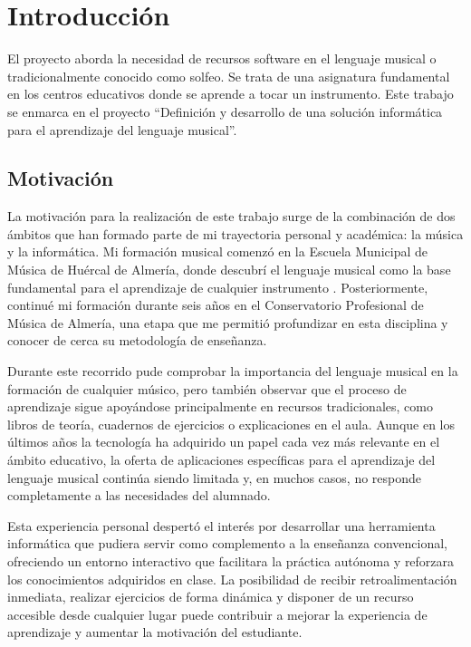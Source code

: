 \chapter {Introducción}
\label{sec:intro}
\rmfamily
El proyecto aborda la necesidad de recursos software en el lenguaje musical o tradicionalmente conocido como solfeo. Se trata de una asignatura fundamental en los centros educativos donde se aprende a tocar un instrumento. Este trabajo se enmarca en el proyecto ``Definición y desarrollo de una solución informática para el aprendizaje del lenguaje musical''.

\section{Motivación}

La motivación para la realización de este trabajo surge de la combinación de dos ámbitos que han formado parte de mi trayectoria personal y académica: la música y la informática. Mi formación musical comenzó en la Escuela Municipal de Música de Huércal de Almería, donde descubrí el lenguaje musical como la base fundamental para el aprendizaje de cualquier instrumento \cite{Kodaly}. Posteriormente, continué mi formación durante seis años en el Conservatorio Profesional de Música de Almería, una etapa que me permitió profundizar en esta disciplina y conocer de cerca su metodología de enseñanza.

Durante este recorrido pude comprobar la importancia del lenguaje musical en la formación de cualquier músico, pero también observar que el proceso de aprendizaje sigue apoyándose principalmente en recursos tradicionales, como libros de teoría, cuadernos de ejercicios o explicaciones en el aula. Aunque en los últimos años la tecnología ha adquirido un papel cada vez más relevante en el ámbito educativo, la oferta de aplicaciones específicas para el aprendizaje del lenguaje musical continúa siendo limitada y, en muchos casos, no responde completamente a las necesidades del alumnado.

Esta experiencia personal despertó el interés por desarrollar una herramienta informática que pudiera servir como complemento a la enseñanza convencional, ofreciendo un entorno interactivo que facilitara la práctica autónoma y reforzara los conocimientos adquiridos en clase. La posibilidad de recibir retroalimentación inmediata, realizar ejercicios de forma dinámica y disponer de un recurso accesible desde cualquier lugar puede contribuir a mejorar la experiencia de aprendizaje y aumentar la motivación del estudiante.

